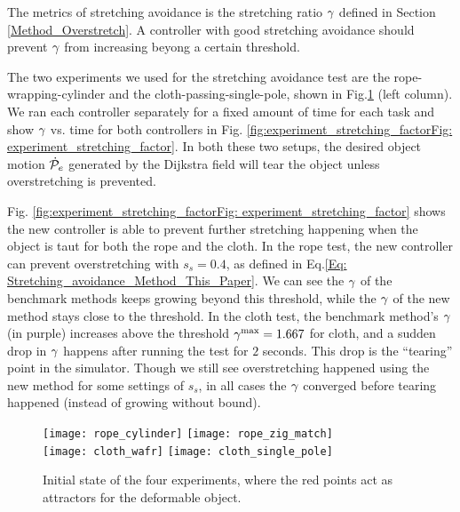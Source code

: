 The metrics of stretching avoidance is the stretching ratio $\gamma$ defined in Section \ref{Method_Overstretch}. A controller with good stretching avoidance should prevent $\gamma$ from increasing beyong a certain threshold.

The two experiments we used for the stretching avoidance test are the rope-wrapping-cylinder and the cloth-passing-single-pole, shown in Fig.\ref{fig:experimental_setup_scene} (left column). We ran each controller separately for a fixed amount of time for each task and show $\gamma$ vs. time for both controllers in Fig. \ref{fig:experiment_stretching_factorFig: experiment_stretching_factor}. In both these two setups, the desired object motion $\dot{\mathcal{P}}_e$ generated by the Dijkstra field will tear the object unless overstretching is prevented.%

Fig. \ref{fig:experiment_stretching_factorFig: experiment_stretching_factor} shows the new controller is able to prevent further stretching happening when the object is taut for both the rope and the cloth. In the rope test, the new controller can prevent overstretching with $s_s = 0.4$, as defined in Eq.\ref{Eq: Stretching_avoidance_Method_This_Paper}. We can see the $\gamma$ of the benchmark methods keeps growing beyond this threshold, while the $\gamma$ of the new method stays close to the threshold. In the cloth test, the benchmark method's $\gamma$ (in purple) increases above the threshold $\gamma^{\textrm{max}} = 1.667$ for cloth, and a sudden drop in $\gamma$ happens after running the test for $2$ seconds. This drop is the ``tearing'' point in the simulator. Though we still see overstretching happened using the new method for some settings of $s_s$, in all cases the $\gamma$ converged before tearing happened (instead of growing without bound). 

\begin{figure}[t]
    \centering
    \texttt{[image: rope\_cylinder]}\hfill
    \texttt{[image: rope\_zig\_match]}\\
    \texttt{[image: cloth\_wafr]}\hfill
    \texttt{[image: cloth\_single\_pole]}%
    \caption{Initial state of the four experiments, where the red points act as attractors for the deformable object.}
    \label{fig:experimental_setup_scene}
\end{figure}


